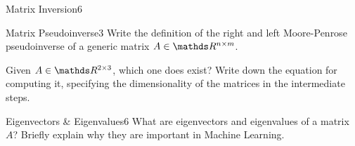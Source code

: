 \begin{questions}
\begin{question}{Matrix Inversion}{6}
\begin{answer}\end{answer}

\end{question}
	

\begin{question}{Matrix Pseudoinverse}{3}
	Write the definition of the right and left Moore-Penrose pseudoinverse of a generic matrix $A \in \R^{n\times m}$.
	
	Given $A \in \R^{2 \times 3}$, which one does exist? Write down the equation for computing it, specifying the dimensionality of the matrices in the intermediate steps.
	
\begin{answer}\end{answer}
\end{question}


\begin{question}{Eigenvectors \& Eigenvalues}{6}
What are eigenvectors and eigenvalues of a matrix $A$? Briefly explain why they are important in Machine Learning.

\begin{answer}\end{answer}

\end{question}


\end{questions}
